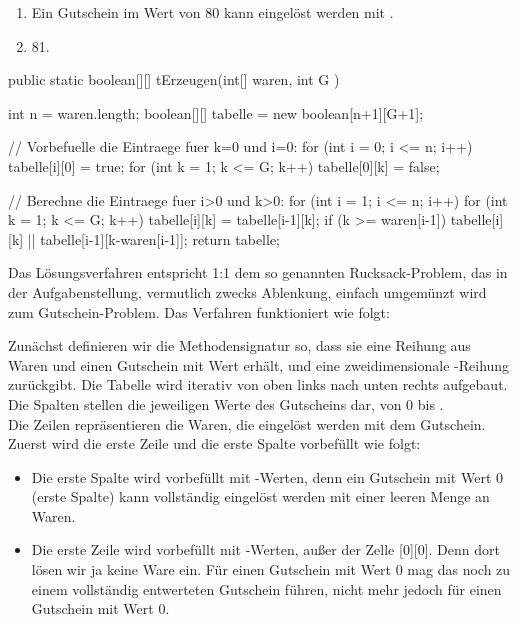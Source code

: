 \newpage
\begin{aufgabe}%
\begin{teile}
	\item
	\begin{enumerate}[label=\roman*.)]
		\item Ein Gutschein  im Wert von 80 kann eingelöst werden mit .
		\item 81. \\
		
	\end{enumerate}	
	
	\item
	\begin{java}
	public static boolean[][] tErzeugen(int[] waren, 
	                                    int G       ) {
    	int n = waren.length;
    	boolean[][] tabelle = new boolean[n+1][G+1];
    
    	// Vorbefuelle die Eintraege fuer k=0 und i=0:
    	for (int i = 0; i <= n; i++) 
        	tabelle[i][0] = true;
    	for (int k = 1; k <= G; k++) 
        	tabelle[0][k] = false;
    	 
    	// Berechne die Eintraege fuer i>0 und k>0:
    	for (int i = 1; i <= n; i++)
    	    for (int k = 1; k <= G; k++) {
              tabelle[i][k] = tabelle[i-1][k];
              if (k >= waren[i-1]) 
                  tabelle[i][k] || 
                  tabelle[i-1][k-waren[i-1]];
          }
    	return tabelle;
	}
	\end{java}
	
	Das Lösungsverfahren entspricht 1:1 dem so genannten \glqq Rucksack-Problem\grqq, das in der Aufgabenstellung, vermutlich zwecks Ablenkung, einfach umgemünzt wird zum \glqq Gutschein-Problem\grqq.
	Das Verfahren funktioniert wie folgt:
	
	
	Zunächst definieren wir die Methodensignatur so, dass sie eine Reihung aus Waren  und einen Gutschein mit Wert  erhält, und eine zweidimensionale -Reihung zurückgibt.	
	Die Tabelle wird iterativ von oben links nach unten rechts aufgebaut. \\	
	Die Spalten stellen die jeweiligen Werte des Gutscheins dar, von 0 bis .\\
	Die Zeilen repräsentieren die Waren, die eingelöst werden mit dem Gutschein. \\
	Zuerst wird die erste Zeile und die erste Spalte vorbefüllt wie folgt: 
	\begin{itemize}
	\item Die erste Spalte wird vorbefüllt mit -Werten, denn ein Gutschein mit Wert 0 (erste Spalte) kann vollständig eingelöst werden mit einer leeren Menge an Waren. 
	\item Die erste Zeile wird vorbefüllt mit -Werten, außer der  Zelle [0][0]. 
	Denn dort lösen wir ja keine Ware ein. Für einen Gutschein mit Wert 0 mag das noch zu einem vollständig entwerteten Gutschein führen, nicht mehr jedoch für einen Gutschein mit Wert \code{>}0.
	\end{itemize}
	

\end{teile}
\end{aufgabe}
